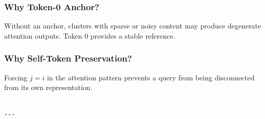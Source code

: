 \subsubsection{Why Token-0 Anchor?}

Without an anchor, clusters with sparse or noisy content may produce 
degenerate attention outputs. Token 0 provides a stable reference.

\subsubsection{Why Self-Token Preservation?}

Forcing $j = i$ in the attention pattern prevents a query from being 
disconnected from its own representation.
\begin{lstlisting}

---
\end{lstlisting}